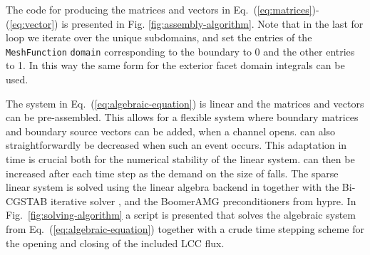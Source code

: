 The code for producing the matrices and vectors in Eq.~(\ref{eq:matrices})-(\ref{eq:vector}) is presented in Fig. \ref{fig:assembly-algorithm}. Note that in the last for loop we iterate over the unique subdomains, and set the entries of the \texttt{MeshFunction} \texttt{domain} corresponding to the \kth boundary to 0 and the other entries to 1. In this way the same form for the exterior facet domain integrals can be used.\par

The system in Eq.~(\ref{eq:algebraic-equation}) is linear and the matrices and vectors can be pre-assembled. This allows for a flexible system where boundary matrices and boundary source vectors can be added, when a channel opens. \Dt can also straightforwardly be decreased when such an event occurs. This adaptation in time is crucial both for the numerical stability of the linear system. \Dt can then be increased after each time step as the demand on the size of \Dt falls. The sparse linear system is solved using the \petsc linear algebra backend\cite{www:petsc} in \pydolfin together with the Bi-CGSTAB iterative solver \cite{Vors_1992_631}, and the BoomerAMG preconditioners from hypre\cite{Falg_2002_632_inproc}. In Fig.~\ref{fig:solving-algorithm} a script is presented that solves the algebraic system from Eq.~(\ref{eq:algebraic-equation}) together with a crude time stepping scheme for the opening and closing of the included LCC flux.\par

